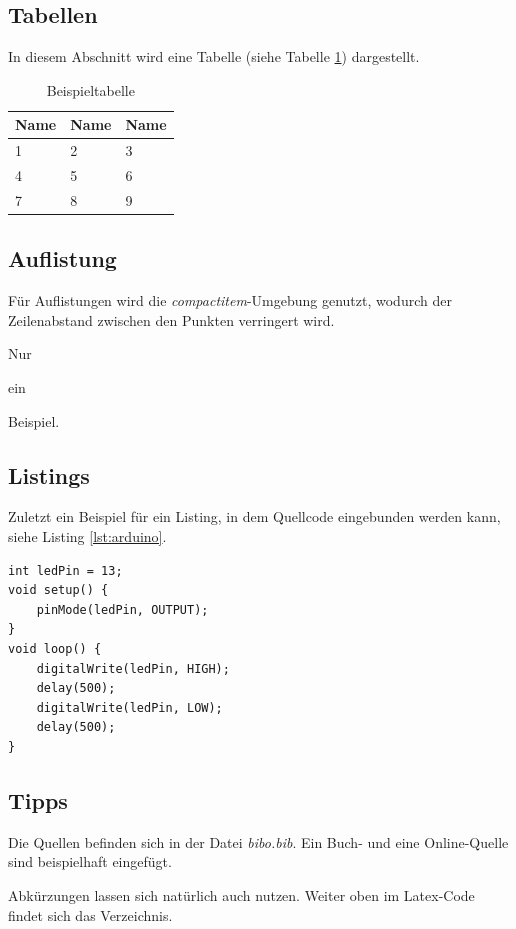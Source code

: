 \documentclass[12pt,a4paper,bibliography=totocnumbered,listof=totoc]{scrartcl}
\begin{document}
\subsection{Tabellen}
In diesem Abschnitt wird eine Tabelle (siehe Tabelle \ref{tab:beispiel}) dargestellt.

\vspace{1em}
\begin{table}[!h]
	\centering
	\begin{tabular}{|l|l|l|}
		\hline
		\textbf{Name} & \textbf{Name} & \textbf{Name}\\
		\hline
		1 & 2 & 3\\
		\hline
		4 & 5 & 6\\
		\hline
		7 & 8 & 9\\
		\hline
	\end{tabular}
	\caption{Beispieltabelle}
	\label{tab:beispiel}
\end{table}

\pagebreak
\subsection{Auflistung}
Für Auflistungen wird die \textit{compactitem}-Umgebung genutzt, wodurch der Zeilenabstand zwischen den Punkten verringert wird.

\begin{compactitem}
	\item Nur
	\item ein
	\item Beispiel.
\end{compactitem}

\subsection{Listings}
Zuletzt ein Beispiel für ein Listing, in dem Quellcode eingebunden werden kann, siehe Listing \ref{lst:arduino}.

\vspace{1em}
\begin{lstlisting}[caption=Arduino Beispielprogramm, label=lst:arduino]
int ledPin = 13;
void setup() {
    pinMode(ledPin, OUTPUT);
}
void loop() {
    digitalWrite(ledPin, HIGH);
    delay(500);
    digitalWrite(ledPin, LOW);
    delay(500);
}
\end{lstlisting}

\subsection{Tipps}
Die Quellen befinden sich in der Datei \textit{bibo.bib}. Ein Buch- und eine Online-Quelle sind beispielhaft eingefügt.

Abkürzungen lassen sich natürlich auch nutzen. Weiter oben im Latex-Code findet sich das Verzeichnis.
\pagebreak






\end{document}
